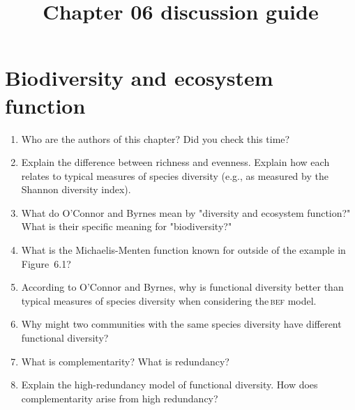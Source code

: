 \documentclass[letterpaper]{tufte-handout}
\title{Chapter 06 discussion guide}
\date{} %
\begin{document}
\maketitle	%

\section*{Biodiversity and ecosystem function}

\begin{enumerate}

	\item Who are the authors of this chapter? Did you check this time?%
	
	\item Explain the difference between richness and evenness. Explain how each relates to typical measures of species diversity (e.g., as measured by the Shannon diversity index).
	
	\item What do O'Connor and Byrnes mean by "diversity and ecosystem function?" What is their specific meaning for "biodiversity?"
		
	\item What is the Michaelis-Menten function known for outside of the example in Figure~6.1?
	
	\item According to O'Connor and Byrnes, why is functional diversity better than typical measures of species diversity when considering the\,\textsc{bef} model.
	
	\item Why might two communities with the same species diversity  have different functional diversity?
	

	\item What is complementarity? What is redundancy?

	\item Explain the high-redundancy model of functional diversity. How does complementarity arise from high redundancy? 
	

\end{enumerate}
\end{document}
